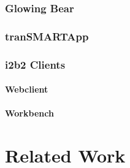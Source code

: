 \subsubsection{Glowing Bear}

\subsubsection{tranSMARTApp}


\subsubsection{i2b2 Clients}
\paragraph{Webclient}

\paragraph{Workbench}

\section{Related Work}



